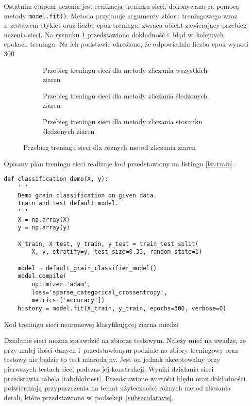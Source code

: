 Ostatnim etapem uczenia jest realizacja treningu sieci, dokonywana za
pomocą metody \texttt{model.fit()}.
Metoda przyjmuje argumenty zbioru treningowego wraz z~zestawem etykiet
oraz liczbę epok treningu, zwraca obiekt zawierający przebieg uczenia sieci.
Na rysunku \ref{fig:history} przedstawiono dokładność i~błąd w~kolejnych
epokach treningu.
Na ich podstawie określono, że odpowiednia liczba epok wynosi 300.
\begin{figure}[htb]
	\centering
	\begin{subfigure}[t]{0.3\textwidth}
		\centering
		
		\caption{Przebieg treningu sieci dla metody zliczania wszystkich
		         ziaren}
	\end{subfigure}
	\hfill
	\begin{subfigure}[t]{0.3\textwidth}
		\centering
		
		\caption{Przebieg treningu sieci dla metody zliczania śledzonych 
		         ziaren}
	\end{subfigure}
	\hfill
	\begin{subfigure}[t]{0.3\textwidth}
		\centering
		
		\caption{Przebieg treningu sieci dla metody zliczania stosunku
		         śledzonych ziaren}
	\end{subfigure}
	\caption{Przebieg treningu sieci dla różnych metod zliczania ziaren}
	\label{fig:history}
\end{figure}
Opisany plan treningu sieci realizuje kod przedstawiony na listingu
\ref{lst:train}.
\begin{listing}[htb]
\begin{verbatim}
def classification_demo(X, y):
    '''
    Demo grain classification on given data.
    Train and test default model.
    '''
    X = np.array(X)
    y = np.array(y)

    X_train, X_test, y_train, y_test = train_test_split(
        X, y, stratify=y, test_size=0.33, random_state=1)

    model = default_grain_classifier_model()
    model.compile(
        optimizer='adam',
        loss='sparse_categorical_crossentropy',
        metrics=['accuracy'])
    history = model.fit(X_train, y_train, epochs=300, verbose=0)
\end{verbatim}
\caption{Kod treningu sieci neuronowej klasyfikującej ziarna miedzi}
\label{lst:train}
\end{listing}

Działanie sieci można sprawdzić na zbiorze testowym.
Należy mieć na uwadze, że przy małej ilości danych i~przedstawionym
podziale na zbiory treningowy oraz testowy nie będzie to test miarodajny.
Jest on jednak akceptowalny przy pierwszych testach sieci podczas jej
konstrukcji.
Wyniki działania sieci przedstawia tabela \ref{tab:blobtest}.
Przedstawione wartości błędu oraz dokładności potwierdzają przypuszczenia
na temat użyteczności różnych metod zliczania detali, które przedstawiono
w~podsekcji~\ref{subsec:datavis}.

